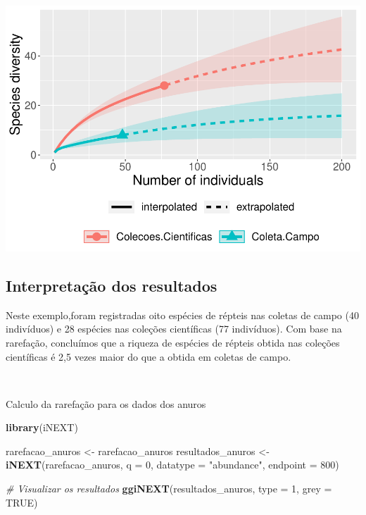 \documentclass[
]{book}
\newenvironment{Shaded}{\begin{snugshade}}{\end{snugshade}}
\newcommand{\CommentTok}[1]{\textcolor[rgb]{0.56,0.35,0.01}{\textit{#1}}}
\newcommand{\DataTypeTok}[1]{\textcolor[rgb]{0.13,0.29,0.53}{#1}}
\newcommand{\DecValTok}[1]{\textcolor[rgb]{0.00,0.00,0.81}{#1}}
\newcommand{\KeywordTok}[1]{\textcolor[rgb]{0.13,0.29,0.53}{\textbf{#1}}}
\newcommand{\NormalTok}[1]{#1}
\newcommand{\OtherTok}[1]{\textcolor[rgb]{0.56,0.35,0.01}{#1}}
\newcommand{\StringTok}[1]{\textcolor[rgb]{0.31,0.60,0.02}{#1}}
\begin{document}
\includegraphics{livro_r_ecologia_files/figure-latex/unnamed-chunk-41-1.pdf}

\hypertarget{interpretauxe7uxe3o-dos-resultados-1}{%
\subsection{Interpretação dos resultados}\label{interpretauxe7uxe3o-dos-resultados-1}}

Neste exemplo,foram registradas oito espécies de répteis nas coletas de campo (40 indivíduos) e 28 espécies nas coleções científicas (77 indivíduos). Com base na rarefação, concluímos que a riqueza de espécies de répteis obtida nas coleções científicas é 2,5 vezes maior do que a obtida em coletas de campo.

~

Calculo da rarefação para os dados dos anuros

\begin{Shaded}
\begin{Highlighting}[]
\KeywordTok{library}\NormalTok{(iNEXT)}

\NormalTok{rarefacao_anuros <-}\StringTok{ }\NormalTok{rarefacao_anuros}
\NormalTok{resultados_anuros <-}\StringTok{ }\KeywordTok{iNEXT}\NormalTok{(rarefacao_anuros, }\DataTypeTok{q =} \DecValTok{0}\NormalTok{, }\DataTypeTok{datatype =} \StringTok{"abundance"}\NormalTok{, }\DataTypeTok{endpoint =} \DecValTok{800}\NormalTok{)}

\CommentTok{# Visualizar os resultados }
\KeywordTok{ggiNEXT}\NormalTok{(resultados_anuros, }\DataTypeTok{type =} \DecValTok{1}\NormalTok{, }\DataTypeTok{grey =} \OtherTok{TRUE}\NormalTok{)}
\end{Highlighting}
\end{Shaded}
\end{document}
